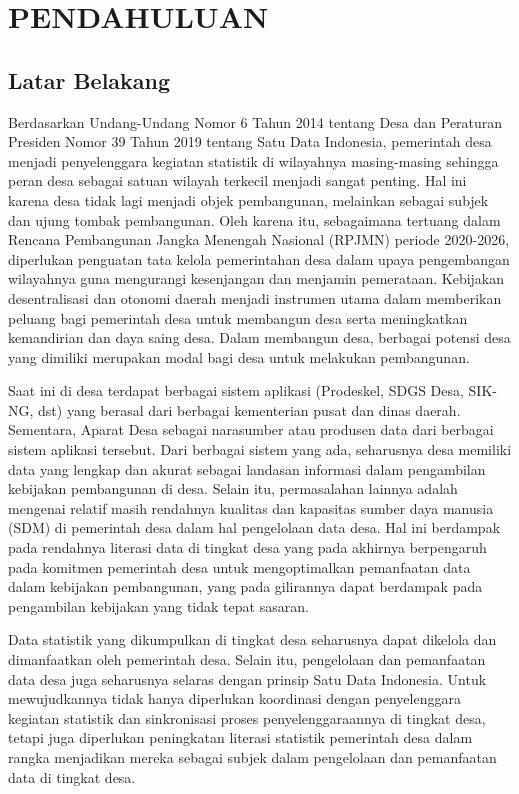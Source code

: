 
\chapter{PENDAHULUAN}

\section{Latar Belakang}

Berdasarkan Undang-Undang Nomor 6 Tahun 2014 tentang Desa dan Peraturan Presiden Nomor 39 Tahun 2019 tentang Satu Data Indonesia, pemerintah desa menjadi penyelenggara kegiatan statistik di wilayahnya masing-masing sehingga peran desa sebagai satuan wilayah terkecil menjadi sangat penting. Hal ini karena desa tidak lagi menjadi objek pembangunan, melainkan sebagai subjek dan ujung tombak pembangunan. Oleh karena itu, sebagaimana tertuang dalam Rencana Pembangunan Jangka Menengah Nasional (RPJMN) periode 2020-2026, diperlukan penguatan tata kelola pemerintahan desa dalam upaya pengembangan wilayahnya guna mengurangi kesenjangan dan menjamin pemerataan. Kebijakan desentralisasi dan otonomi daerah menjadi instrumen utama dalam memberikan peluang bagi pemerintah desa untuk membangun desa serta meningkatkan kemandirian dan daya saing desa. Dalam membangun desa, berbagai potensi desa yang dimiliki merupakan modal bagi desa untuk melakukan pembangunan.

Saat ini di desa terdapat berbagai sistem aplikasi (Prodeskel, SDGS Desa, SIK-NG, dst) yang berasal dari berbagai kementerian pusat dan dinas daerah. Sementara, Aparat Desa sebagai narasumber atau produsen data dari berbagai sistem aplikasi tersebut. Dari berbagai sistem yang ada, seharusnya desa memiliki data yang lengkap dan akurat sebagai landasan informasi dalam pengambilan kebijakan pembangunan di desa. Selain itu, permasalahan lainnya adalah mengenai relatif masih rendahnya kualitas dan kapasitas sumber daya manusia (SDM) di pemerintah desa dalam hal pengelolaan data desa. Hal ini berdampak pada rendahnya literasi data di tingkat desa yang pada akhirnya berpengaruh pada komitmen pemerintah desa untuk mengoptimalkan pemanfaatan data dalam kebijakan pembangunan, yang pada gilirannya dapat berdampak pada pengambilan kebijakan yang tidak tepat sasaran.

Data statistik yang dikumpulkan di tingkat desa seharusnya dapat dikelola dan dimanfaatkan oleh pemerintah desa. Selain itu, pengelolaan dan pemanfaatan data desa juga seharusnya selaras dengan prinsip Satu Data Indonesia. Untuk mewujudkannya tidak hanya diperlukan koordinasi dengan penyelenggara kegiatan statistik dan sinkronisasi proses penyelenggaraannya di tingkat desa, tetapi juga diperlukan peningkatan literasi statistik pemerintah desa dalam rangka menjadikan mereka sebagai subjek dalam pengelolaan dan pemanfaatan data di tingkat desa.

